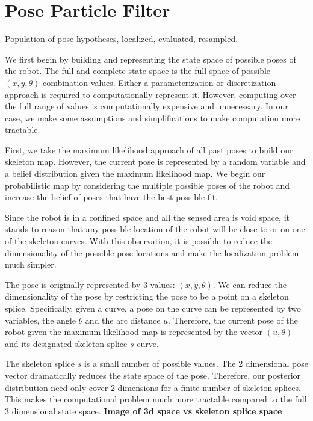 \section{Pose Particle Filter}
\label{particle_filter}

Population of pose hypotheses, localized, evaluated, resampled.

We first begin by building and representing the state space of possible poses of the robot. The full and complete state space is the full space of possible $(x,y,\theta)$ combination values. Either a parameterization or discretization approach is required to computationally represent it. However, computing over the full range of values is computationally expensive and unnecessary. In our case, we make some assumptions and simplifications to make computation more tractable.

First, we take the maximum likelihood approach of all past poses to build our skeleton map. However, the current pose is represented by a random variable and a belief distribution given the maximum likelihood map. We begin our probabilistic map by considering the multiple possible poses of the robot and increase the belief of poses that have the best possible fit.

Since the robot is in a confined space and all the sensed area is void space, it stands to reason that any possible location of the robot will be close to or on one of the skeleton curves. With this observation, it is possible to reduce the dimensionality of the possible pose locations and make the localization problem much simpler.

The pose is originally represented by 3 values: $(x,y,\theta)$. We can reduce the dimensionality of the pose by restricting the pose to be a point on a skeleton splice. Specifically, given a curve, a pose on the curve can be represented by two variables, the angle $\theta$ and the arc distance $u$. Therefore, the current pose of the robot given the maximum likelihood map is represented by the vector $ (u,\theta) $ and its designated skeleton splice $s$ curve.

The skeleton splice $s$ is a small number of possible values. The 2 dimensional pose vector dramatically reduces the state space of the pose. Therefore, our posterior distribution need only cover 2 dimensions for a finite number of skeleton splices. This makes the computational problem much more tractable compared to the full 3 dimensional state space. \textbf{Image of 3d space vs skeleton splice space }

